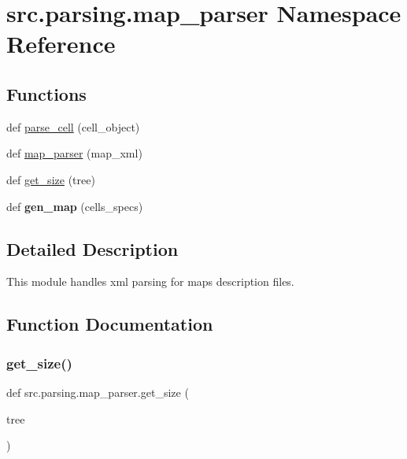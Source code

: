 \hypertarget{namespacesrc_1_1parsing_1_1map__parser}{}\section{src.\+parsing.\+map\+\_\+parser Namespace Reference}
\label{namespacesrc_1_1parsing_1_1map__parser}
\subsection*{Functions}
\begin{DoxyCompactItemize}
\item 
def \hyperlink{namespacesrc_1_1parsing_1_1map__parser_a3ca3423b50510f49ec7b852bf2e46c66}{parse\+\_\+cell} (cell\+\_\+object)
\item 
def \hyperlink{namespacesrc_1_1parsing_1_1map__parser_a168e2a9de841161325b60d9b04e1c4f6}{map\+\_\+parser} (map\+\_\+xml)
\item 
def \hyperlink{namespacesrc_1_1parsing_1_1map__parser_a7e57a61db843c358bed2efc432c2c39f}{get\+\_\+size} (tree)
\item 
\hypertarget{namespacesrc_1_1parsing_1_1map__parser_aefbc73f2ecd783c6a93b3d924bc78258}{}\label{namespacesrc_1_1parsing_1_1map__parser_aefbc73f2ecd783c6a93b3d924bc78258} 
def {\bfseries gen\+\_\+map} (cells\+\_\+specs)
\end{DoxyCompactItemize}


\subsection{Detailed Description}
\begin{DoxyVerb}This module handles xml parsing for maps description files.
\end{DoxyVerb}
 

\subsection{Function Documentation}
\hypertarget{namespacesrc_1_1parsing_1_1map__parser_a7e57a61db843c358bed2efc432c2c39f}{}\label{namespacesrc_1_1parsing_1_1map__parser_a7e57a61db843c358bed2efc432c2c39f} 
\subsubsection{\texorpdfstring{get\+\_\+size()}{get\_size()}}
{\footnotesize\ttfamily def src.\+parsing.\+map\+\_\+parser.\+get\+\_\+size (\begin{DoxyParamCaption}\item[{}]{tree }\end{DoxyParamCaption})}

